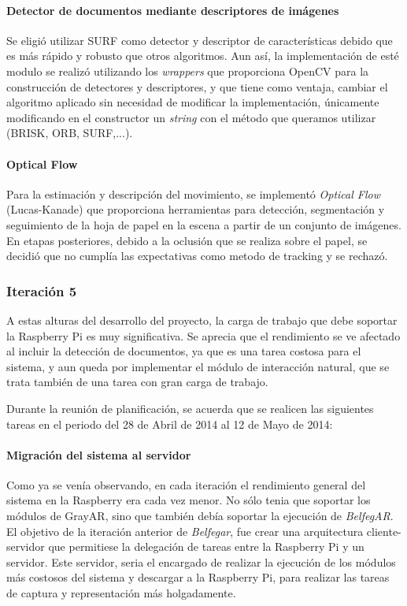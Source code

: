 \paragraph{Detector de documentos mediante descriptores de imágenes} 
Se eligió utilizar SURF como detector y descriptor de características debido que es más rápido y robusto que otros algoritmos. Aun así, la implementación de esté modulo se realizó utilizando los \textit{wrappers} que proporciona OpenCV para la construcción de detectores y descriptores, y que tiene como ventaja, cambiar el algoritmo aplicado sin necesidad de modificar la implementación, únicamente modificando en el constructor un \textit{string} con el método que queramos utilizar (BRISK, ORB, SURF,...).

\paragraph{Optical Flow}
Para la estimación y descripción del movimiento, se implementó \textit{Optical Flow} (Lucas-Kanade) que proporciona herramientas para detección, segmentación y seguimiento de la hoja de papel en la escena a partir de un conjunto de imágenes. En etapas posteriores, debido a la oclusión que se realiza sobre el papel, se decidió que no cumplía las expectativas como metodo de tracking y se rechazó. 

\subsubsection{Iteración 5}
A estas alturas del desarrollo del proyecto, la carga de trabajo que debe soportar la Raspberry Pi es muy significativa. Se aprecia que el rendimiento se ve afectado al incluir la detección de documentos, ya que es una tarea costosa para el sistema, y aun queda por implementar el módulo de interacción natural, que se trata también de una tarea con gran carga de trabajo.

Durante la reunión de planificación, se acuerda que se realicen las siguientes tareas en el periodo del 28 de Abril de 2014 al 12 de Mayo de 2014:

\paragraph{Migración del sistema al servidor}
Como ya se venía observando, en cada iteración el rendimiento general del sistema en la Raspberry era cada vez menor. No sólo tenia que soportar los módulos de GrayAR, sino que también debía soportar la ejecución de \textit{BelfegAR}. El objetivo de la iteración anterior de \textit{Belfegar}, fue crear una arquitectura cliente-servidor que permitiese la delegación de tareas entre la Raspberry Pi y un servidor. Este servidor, seria el encargado de realizar la ejecución de los módulos más costosos del sistema y descargar a la Raspberry Pi, para realizar las tareas de captura y representación más holgadamente.

